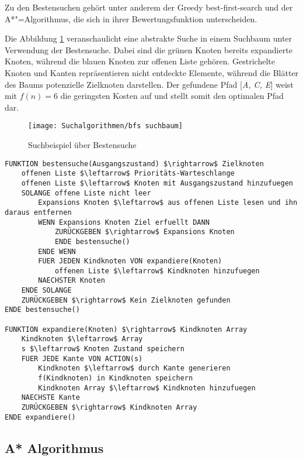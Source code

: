 Zu den Bestensuchen geh\"{o}rt unter anderem der Greedy best-first-search und der A*"=Algorithmus, die sich in ihrer Bewertungsfunktion unterscheiden.

Die Abbildung \ref{fig:bestensuche beispiel} veranschaulicht eine abstrakte Suche in einem Suchbaum unter Verwendung der Bestensuche. Dabei sind die gr\"{u}nen Knoten bereits expandierte Knoten, w\"{a}hrend die blauen Knoten zur offenen Liste geh\"{o}ren. Gestrichelte Knoten und Kanten repr\"{a}sentieren nicht entdeckte Elemente, w\"{a}hrend die Bl\"{a}tter des Baums potenzielle Zielknoten darstellen. Der gefundene Pfad [\textit{A, C, E}] weist mit $f(n) = 6$ die geringsten Kosten auf und stellt somit den optimalen Pfad dar.


\begin{figure}[h]
  \centering
  \texttt{[image: Suchalgorithmen/bfs suchbaum]}
	\captionsetup{justification=justified, format=plain}
  \caption{Suchbeispiel \"{u}ber Bestensuche}
  \label{fig:bestensuche beispiel}
\end{figure}


\begin{lstlisting}[language=Pseudo, caption={Pseudocode: Bestensuche}, mathescape=true, label={lst:pseudo bestensuche}]
FUNKTION bestensuche(Ausgangszustand) $\rightarrow$ Zielknoten
    offenen Liste $\leftarrow$ Prioritäts-Warteschlange
    offenen Liste $\leftarrow$ Knoten mit Ausgangszustand hinzufuegen
    SOLANGE offene Liste nicht leer
        Expansions Knoten $\leftarrow$ aus offenen Liste lesen und ihn daraus entfernen
        WENN Expansions Knoten Ziel erfuellt DANN
            ZURÜCKGEBEN $\rightarrow$ Expansions Knoten
            ENDE bestensuche()
        ENDE WENN
        FUER JEDEN Kindknoten VON expandiere(Knoten)
            offenen Liste $\leftarrow$ Kindknoten hinzufuegen
        NAECHSTER Knoten
    ENDE SOLANGE
    ZURÜCKGEBEN $\rightarrow$ Kein Zielknoten gefunden
ENDE bestensuche()

FUNKTION expandiere(Knoten) $\rightarrow$ Kindknoten Array
    Kindknoten $\leftarrow$ Array
    s $\leftarrow$ Knoten Zustand speichern
    FUER JEDE Kante VON ACTION(s)
        Kindknoten $\leftarrow$ durch Kante generieren
        f(Kindknoten) in Kindknoten speichern
        Kindknoten Array $\leftarrow$ Kindknoten hinzufuegen
    NAECHSTE Kante
    ZURÜCKGEBEN $\rightarrow$ Kindknoten Array
ENDE expandiere()
\end{lstlisting}

\subsection{A* Algorithmus}
\label{chap:a stern suchalgorithmus}

